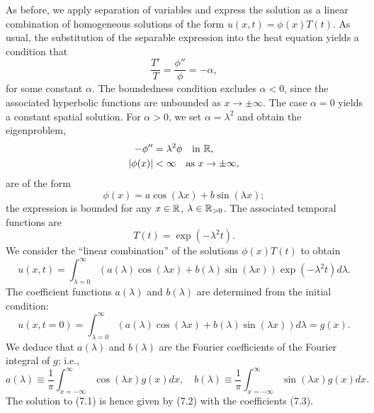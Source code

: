 As before, we apply separation of variables and express the solution as a linear combination of homogeneous solutions of the form $u(x, t) = \phi(x) T(t)$. As usual, the substitution of the separable expression into the heat equation yields a condition that
\[\frac{T'}{T} = \frac{\phi''}{\phi} = -\alpha,\]
for some constant $\alpha$. The boundedness condition excludes $\alpha < 0$, since the associated hyperbolic functions are unbounded as $x \to \pm\infty$. The case $\alpha = 0$ yields a constant spatial solution. For $\alpha > 0$, we set $\alpha = \lambda^2$ and obtain the eigenproblem,
\begin{align*}
    -\phi'' &= \lambda^2 \phi \quad \text{in } \mathbb{R}, \\
    |\phi(x)| &< \infty \quad \text{as } x \to \pm\infty,
\end{align*}
are of the form
\[\phi(x) = a \cos(\lambda x) + b \sin(\lambda x);\]
the expression is bounded for any $x \in \mathbb{R}$, $\lambda \in \mathbb{R}_{>0}$. The associated temporal functions are
\[T(t) = \exp(-\lambda^2 t).\]
We consider the ``linear combination'' of the solutions $\phi(x) T(t)$ to obtain
\begin{equation*}
    u(x, t) = \int_{\lambda=0}^{\infty} \left(a(\lambda) \cos(\lambda x) + b(\lambda) \sin(\lambda x)\right) \exp(-\lambda^2 t) d\lambda. \tag{7.2}
\end{equation*}
The coefficient functions $a(\lambda)$ and $b(\lambda)$ are determined from the initial condition:
\[u(x, t = 0) = \int_{\lambda=0}^{\infty} \left(a(\lambda) \cos(\lambda x) + b(\lambda) \sin(\lambda x)\right) d\lambda = g(x).\]
We deduce that $a(\lambda)$ and $b(\lambda)$ are the Fourier coefficients of the Fourier integral of $g$; i.e.,
\begin{equation*}
    a(\lambda) \equiv \frac{1}{\pi} \int_{x=-\infty}^{\infty} \cos(\lambda x) g(x) dx, \quad b(\lambda) \equiv \frac{1}{\pi} \int_{x=-\infty}^{\infty} \sin(\lambda x) g(x) dx. \tag{7.3}
\end{equation*}
The solution to (7.1) is hence given by (7.2) with the coefficients (7.3).

